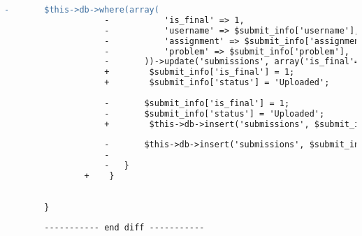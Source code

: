 \begin{lstlisting}[language=diff, caption=Perubahan pada kode Submit\_model.php]
					-		$this->db->where(array(
					-			'is_final' => 1,
					-			'username' => $submit_info['username'],
					-			'assignment' => $submit_info['assignment'],
					-			'problem' => $submit_info['problem'],
					-		))->update('submissions', array('is_final'=>0));
					+        $submit_info['is_final'] = 1;
					+        $submit_info['status'] = 'Uploaded';
					
					-		$submit_info['is_final'] = 1;
					-		$submit_info['status'] = 'Uploaded';
					+        $this->db->insert('submissions', $submit_info);
					
					-		$this->db->insert('submissions', $submit_info);
					-
					-	}
				+    }
			
			
		}
		
		----------- end diff -----------
\end{lstlisting}

